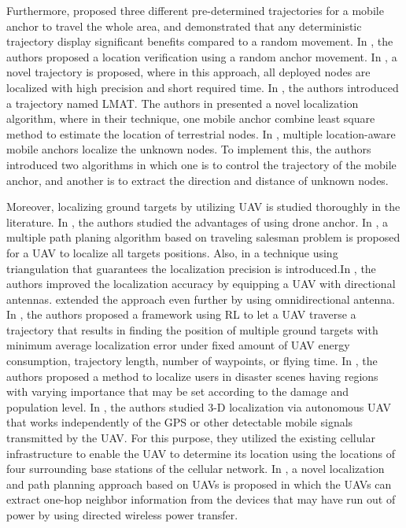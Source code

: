 \documentclass[journal,twocolumn]{IEEEtran}
\begin{document}
Furthermore, \cite{koutsonikolas2007path} proposed three different pre-determined trajectories for a mobile anchor to travel the whole area, and demonstrated that any deterministic trajectory display significant benefits compared to a random movement. In \cite{koutsonikolas2007path}, the authors proposed a location verification using a random anchor movement. In \cite{rezazadeh2014superior}, a novel trajectory is proposed, where in this approach, all deployed nodes are localized with high precision and short required time. In \cite{jiang2011lmat}, the authors introduced a trajectory named LMAT. The authors in \cite{sumathi2011rss} presented a novel localization algorithm, where in their technique, one mobile anchor combine least square method to estimate the location of terrestrial nodes. In \cite{zhang2014localization}, multiple location-aware mobile anchors localize the unknown nodes. To implement this, the authors introduced two algorithms in which one is to control the trajectory of the mobile anchor, and another is to extract the direction and distance of unknown nodes.

Moreover, localizing ground targets by utilizing UAV is studied thoroughly in the literature. In \cite{gong2017design}, the authors studied the advantages of using drone anchor. In \cite{perazzo2016drone}, a multiple path planing algorithm based on traveling salesman problem is proposed for a UAV to localize all targets positions. Also, in \cite{pinotti2016localization} a technique using triangulation that guarantees the localization precision is introduced.In \cite{sorbelli2018precise}, the authors improved the localization accuracy by equipping a UAV with directional antennas. \cite{sorbelli2018range} extended the approach even further by using omnidirectional antenna. In \cite{ebrahimi2020autonomous}, the authors proposed a framework using RL to let a UAV traverse a trajectory that results in finding the position of multiple ground targets with minimum average localization error under fixed amount of UAV energy consumption, trajectory length, number of waypoints, or flying time. In \cite{demiane2020optimized}, the authors proposed a method to localize users in disaster scenes having regions with varying importance that may be set according to the damage and population level.  In \cite{afifi2021autonomous}, the authors studied 3-D localization via autonomous UAV that works independently of the GPS or other detectable mobile signals transmitted by the UAV. For this purpose, they utilized the existing cellular infrastructure to enable the UAV to determine its location using the locations of four surrounding base stations of the cellular network. In \cite{atif2021uav}, a novel localization and path planning approach based on UAVs is proposed in which the UAVs can extract one-hop neighbor information from the devices that may have run out of power by using directed wireless power transfer.
\end{document}
